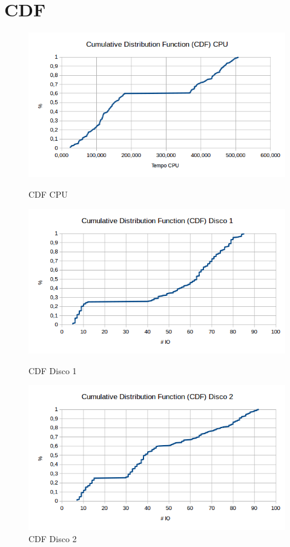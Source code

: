 \documentclass[11pt,a4paper,openany,oneside]{abntex2}
\begin{document}
\section{\textbf{CDF }}
\label{qbcdf}
\begin{figure}[H]
	\begin{minipage}[b]{0.45\linewidth}
		\centering
		\includegraphics[width=\textwidth]{cdfcpu.png}
		\caption{CDF CPU}
		\label{fig:cfdcpu}
	\end{minipage}
    \hspace{0.5cm}
	\begin{minipage}[b]{0.45\linewidth}
		\centering
		\includegraphics[width=\textwidth]{cdfdisco1.png}
		\caption{CDF Disco 1}
		\label{fig:cfdd1}
	\end{minipage}
	\hspace{0.5cm}
	\begin{minipage}[t]{0.45\linewidth}
		\centering
		\includegraphics[width=\textwidth]{cdfdisco2.png}
		\caption{CDF Disco 2}
		\label{fig:cfdd2}
	\end{minipage}
	
\end{figure}
\end{document}
